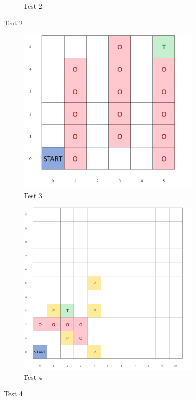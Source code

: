 \documentclass{article}
\begin{document}
\begin{appendices}
\begin{figure}[H]
\begin{subfigure}[b]{0.45\textwidth}
         \caption{Test 2}
         \label{fig:test14}
     \end{subfigure}
\end{figure}

\begin{figure}[H]
   	 \centering
     \begin{subfigure}[b]{0.45\textwidth}
         \centering
         \includegraphics[width=\textwidth]{images/test3.png}
         \caption{Test 3}
         \label{fig:test13}
     \end{subfigure}
     \hfill
     \begin{subfigure}[b]{0.45\textwidth}
         \centering
         \includegraphics[width=\textwidth]{images/image3.png}
         \caption{Test 4}
         \label{fig:test14}
     \end{subfigure}
\end{figure}


\end{appendices}
\end{document}
